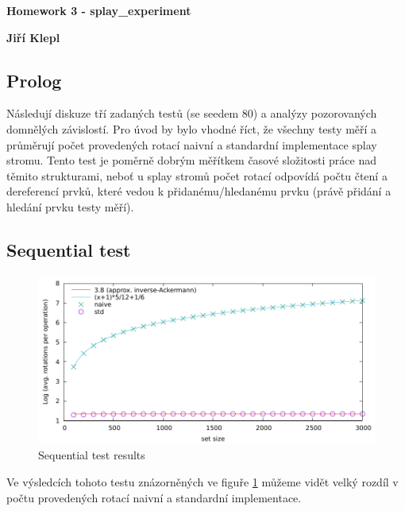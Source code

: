 \documentclass[a4paper,12pt]{article} %
\begin{document}
\thispagestyle{empty} %

\begin{center}
	{\Large \bf Homework 3 - splay\_experiment}
	\vspace{2mm}
	
	{\bf Jiří Klepl}
		
\end{center}  

\vspace{0.4cm}


\setlength{\parindent}{2em}

\subsection*{Prolog}

Následují diskuze tří zadaných testů (se seedem 80) a analýzy pozorovaných domnělých závislostí. Pro úvod by bylo vhodné říct, že všechny testy měří a průměrují počet provedených rotací naivní a standardní implementace splay stromu. Tento test je poměrně dobrým měřítkem časové složitosti práce nad těmito strukturami, neboť u splay stromů počet rotací odpovídá počtu čtení a dereferencí prvků, které vedou k přidanému/hledanému prvku (právě přidání a hledání prvku testy měří).

\subsection*{Sequential test}

\begin{figure}[!htb]
    \caption{Sequential test results}
    \label{seq_results}
    \includegraphics{sequential.pdf}    
\end{figure}

Ve výsledcích tohoto testu znázorněných ve figuře \ref{seq_results} můžeme vidět velký rozdíl v počtu provedených rotací naivní a standardní implementace.
\end{document}

